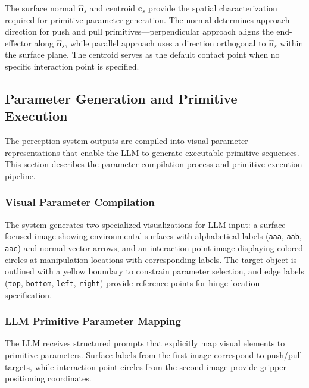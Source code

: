 The surface normal $\hat{\mathbf{n}}_s$ and centroid $\mathbf{c}_s$ provide the spatial characterization required for primitive parameter generation. The normal determines approach direction for push and pull primitives---perpendicular approach aligns the end-effector along $\hat{\mathbf{n}}_s$, while parallel approach uses a direction orthogonal to $\hat{\mathbf{n}}_s$ within the surface plane. The centroid serves as the default contact point when no specific interaction point is specified.



\subsection{Parameter Generation and Primitive Execution}
\label{subsec:parameter_generation_execution}

The perception system outputs are compiled into visual parameter representations that enable the LLM to generate executable primitive sequences. This section describes the parameter compilation process and primitive execution pipeline.

\subsubsection{Visual Parameter Compilation}
\label{subsubsec:visual_parameter_compilation}

The system generates two specialized visualizations for LLM input: a surface-focused image showing environmental surfaces with alphabetical labels (\texttt{aaa}, \texttt{aab}, \texttt{aac}) and normal vector arrows, and an interaction point image displaying colored circles at manipulation locations with corresponding labels. The target object is outlined with a yellow boundary to constrain parameter selection, and edge labels (\texttt{top}, \texttt{bottom}, \texttt{left}, \texttt{right}) provide reference points for hinge location specification.

\subsubsection{LLM Primitive Parameter Mapping}
\label{subsubsec:llm_parameter_mapping}

The LLM receives structured prompts that explicitly map visual elements to primitive parameters. Surface labels from the first image correspond to push/pull targets, while interaction point circles from the second image provide gripper positioning coordinates.